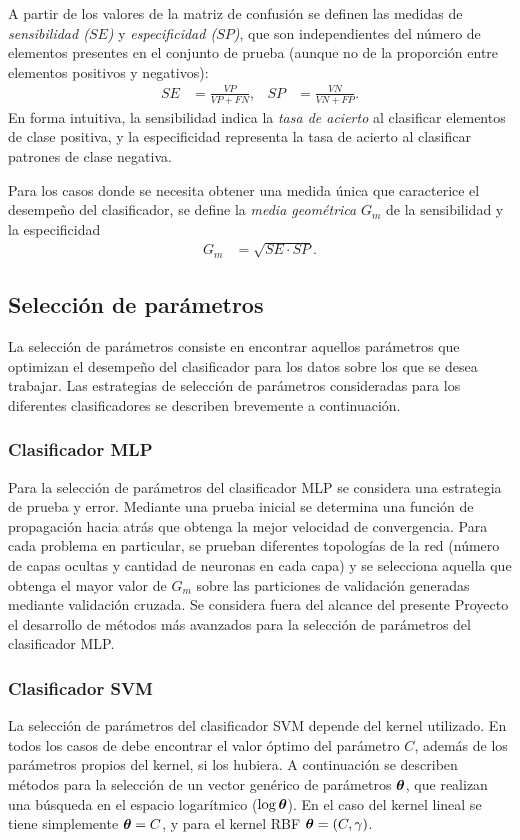 \documentclass[12pt,bibliography=oldstyle,DIV=12,parskip=half-]{scrreprt}
\begin{document}
A partir de los valores de la matriz de confusión se definen las
medidas de \emph{sensibilidad ($SE$)} y \emph{especificidad ($SP$)},
que son independientes del número de elementos presentes en el
conjunto de prueba (aunque no de la proporción entre elementos
positivos y negativos):
\begin{align*}
SE & = \frac{VP}{VP+FN}, & SP & = \frac{VN}{VN+FP}.
\end{align*}
En forma intuitiva, la sensibilidad indica la \emph{tasa de acierto}
al clasificar elementos de clase positiva, y la especificidad
representa la tasa de acierto al clasificar patrones de clase
negativa.

Para los casos donde se necesita obtener una medida única que
caracterice el desempeño del clasificador, se define la \emph{media
  geométrica} $G_m$ de la sensibilidad y la especificidad
\begin{align*}
G_m & = \sqrt{SE\cdot SP}.
\end{align*}
%
%
\subsection{Selección de parámetros}
%
%
La selección de parámetros consiste en encontrar aquellos parámetros
que optimizan el desempeño del clasificador para los datos sobre los
que se desea trabajar. Las estrategias de selección de parámetros
consideradas para los diferentes clasificadores se describen
brevemente a continuación.
%
%
\subsubsection{Clasificador MLP}
%
Para la selección de parámetros del clasificador MLP se considera una
estrategia de prueba y error. Mediante una prueba inicial se determina
una función de propagación hacia atrás que obtenga la mejor velocidad
de convergencia. Para cada problema en particular, se prueban
diferentes topologías de la red (número de capas ocultas y cantidad de
neuronas en cada capa) y se selecciona aquella que obtenga el mayor
valor de $G_m$ sobre las particiones de validación generadas mediante
validación cruzada.  Se considera fuera del alcance del presente Proyecto
el desarrollo de métodos más avanzados para la selección de
parámetros del clasificador MLP.
%
%
\subsubsection{Clasificador SVM}
%
La selección de parámetros del clasificador SVM depende del kernel
utilizado. En todos los casos de debe encontrar el valor óptimo del
parámetro $C$, además de los parámetros propios del kernel, si los
hubiera. A continuación se describen métodos para la selección de un
vector genérico de parámetros $\boldsymbol{\theta}$, que realizan una búsqueda
en el espacio logarítmico ($\log\boldsymbol{\theta}$). En el caso del kernel
lineal se tiene simplemente $\boldsymbol{\theta}=C$, y para el kernel RBF
$\boldsymbol{\theta}=(C,\gamma)$.
%
%
\end{document}
